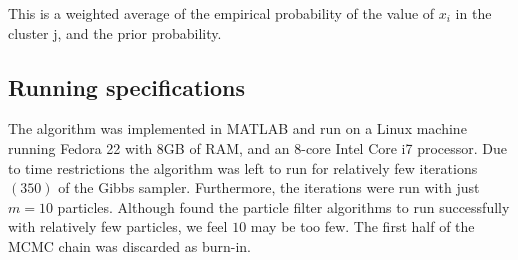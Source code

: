 \documentclass[10pt,a4paper]{article}
\begin{document}
This is a weighted average of the empirical probability  of the value of $x_{i}$ in the cluster j, and the prior probability.

\subsection*{Running specifications}
The algorithm was implemented in MATLAB and run on a Linux machine running Fedora 22 with 8GB of RAM, and an 8-core Intel Core i7 processor. Due to time restrictions the algorithm was left to run for relatively few iterations $(350)$ of the Gibbs sampler. Furthermore, the iterations were run with just $m = 10$ particles. Although  found the particle filter algorithms to run successfully with relatively few particles, we feel $10$ may be too few. The first half of the MCMC chain was discarded as burn-in.
\end{document}
